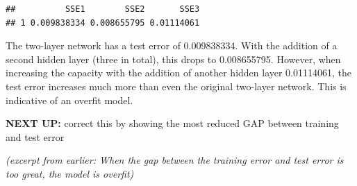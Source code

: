 \begin{Shaded}
\begin{Highlighting}[]
\OtherTok{\textless{}{-}}  \NormalTok{(}\SpecialCharTok{$}

\OtherTok{\textless{}{-}} \SpecialCharTok{{-}}\SpecialCharTok{$}\SpecialCharTok{\^{}}\NormalTok{)}

\end{Highlighting}
\end{Shaded}

\begin{verbatim}
##          SSE1        SSE2       SSE3
## 1 0.009838334 0.008655795 0.01114061
\end{verbatim}

The two-layer network has a test error of 0.009838334.  With the addition of a second hidden layer (three in total), this drops to 0.008655795.  However, when increasing the capacity with the addition of another hidden layer 0.01114061, the test error increases much more than even the original two-layer network.  This is indicative of an overfit model.

\textbf{NEXT UP:} correct this by showing the most reduced GAP between training and test error

\textit{(excerpt from earlier: When the gap between the training error and test error is too great, the model is overfit)}
